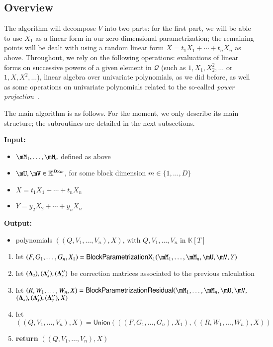 \documentclass[final,1p,times,authoryear]{elsarticle}
\newcommand{\mat}[1]{\bm{\MakeUppercase{#1}}} %
\newcommand{\mainalgoname}{\mathsf{ BlockParametrization}}
\newcommand{\lf}{X}
\newcommand{\mf}{Y}
\newcommand{\residueI}{\mathscr{Q}}
\newcommand{\sqfree}{Q}
\def\K{\mathbb{K}}
\def\K {\ensuremath{\mathbb{K}}}
\begin{document}

\subsection{Overview}

The algorithm will decompose $V$ into two parts: for the first part,
we will be able to use $X_1$ as a linear form in our zero-dimensional
parametrization; the remaining points will be dealt with using a
random linear form $\lf=t_1 X_1 + \cdots + t_n X_n$ as
above. Throughout, we rely on the following operations: evaluations of
linear forms on successive powers of a given element in $\residueI$
(such as $1,X_1,X_2^2,\dots$ or $1,\lf,\lf^2,\dots$), linear
algebra over univariate polynomials, as we did before, as well as some
operations on univariate polynomials related to the so-called {\em
  power projection}~\citep{Shoup94,Shoup99}.

The main algorithm is as follows. For the moment, we only describe its
main structure; the subroutines are detailed in the next subsections.

\begin{algorithm}[H]
  \caption{$\mathsf{BlockParametrizationWithSplitting}(\mM_1,\dots,\mM_n,\mU,\mV,\lf,\mf$)}
  {\bf Input:} \vspace{-0.5em}
  \begin{itemize}
    \item $\mM_1,\dots,\mM_n$ defined as above
    \item  $\mU,\mV \in \mathbb{K}^{D \times m}$, for some block dimension  $m \in \{1,\dots,D\}$
    \item $\lf =t_1 X_1 + \cdots + t_n X_n$
    \item $\mf =y_2 X_2 + \cdots + y_n X_n$
  \end{itemize}
  {\bf Output:}  \vspace{-0.5em}
  \begin{itemize}
    \item polynomials $((\sqfree,V_1,\dots,V_n),\lf)$, with $\sqfree,V_1,\dots,V_n$ in $\K[T]$
  \end{itemize}
  \begin{enumerate}
    \item let $(F,G_1,\dots,G_n,X_1)=\mathsf{BlockParametrizationX}_1(\mM_1,\dots,\mM_n,\mU,\mV,\mf)$
    \item let $(\mat{\Delta}_s),(\mat{\Delta}'_s),(\mat{\Delta}''_s)$ be correction matrices associated
      to the previous calculation
    \item let $(R,W_1,\dots,W_n,\lf)=\mainalgoname{\sf Residual}(\mM_1,\dots,\mM_n,\mU,\mV,$ \\
      \phantom{bla} \hfill $(\mat{\Delta}_s),(\mat{\Delta}'_s),(\mat{\Delta}''_s),\lf)$
    \item let $((\sqfree,V_1,\dots,V_n),\lf)=\mathsf{Union}(((F,G_1,\dots,G_n),X_1), ((R,W_1,\dots,W_n),\lf))$
    \item \textbf{return} $((\sqfree,V_1,\dots,V_n),\lf)$
  \end{enumerate}
\end{algorithm}
\end{document}
